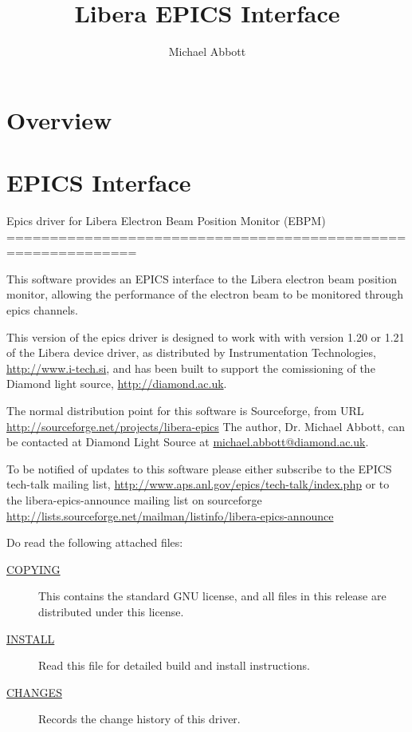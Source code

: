 \documentclass[a4paper,fleqn]{article}
\begin{document}
\title{Libera EPICS Interface}
\author{Michael Abbott}
\maketitle

\section{Overview}

\section{EPICS Interface}

Epics driver for Libera Electron Beam Position Monitor (EBPM)
=============================================================

This software provides an EPICS interface to the Libera electron beam position
monitor, allowing the performance of the electron beam to be monitored through
epics channels.

This version of the epics driver is designed to work with with version 1.20 or
1.21 of the Libera device driver, as distributed by Instrumentation
Technologies, \url{http://www.i-tech.si}, and has been built to support the
comissioning of the Diamond light source, \url{http://diamond.ac.uk}.

The normal distribution point for this software is Sourceforge, from URL
    \url{http://sourceforge.net/projects/libera-epics}
The author, Dr. Michael Abbott, can be contacted at Diamond Light Source at
\url{michael.abbott@diamond.ac.uk}.

To be notified of updates to this software please either subscribe to the
EPICS tech-talk mailing list, 
    \url{http://www.aps.anl.gov/epics/tech-talk/index.php}
or to the libera-epics-announce mailing list on sourceforge
    \url{http://lists.sourceforge.net/mailman/listinfo/libera-epics-announce}


Do read the following attached files:
\begin{description}
\item[\url{COPYING}]
        This contains the standard GNU license, and all files in this release
        are distributed under this license.
\item[\url{INSTALL}]
        Read this file for detailed build and install instructions.
\item[\url{CHANGES}]
        Records the change history of this driver.
\end{description}
\end{document}
